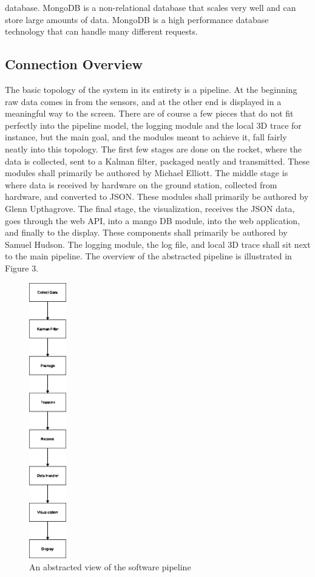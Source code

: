 \documentclass[onecolumn, draftclsnofoot,10pt, compsoc]{IEEEtran}
\begin{document}
database. MongoDB is a non-relational database that scales very well and can store large amounts of data. MongoDB is a high performance database technology that can handle many different requests.
\subsection {Connection Overview} 
The basic topology of the system in its entirety is a pipeline. At the beginning raw data comes in from the sensors, and at the other end is displayed in a meaningful way to the screen. There are of course a few pieces that do not fit perfectly into the pipeline model, the logging module and the local 3D trace for instance, but the main goal, and the modules meant to achieve it, fall fairly neatly into this topology. The first few stages are done on the rocket, where the data is collected, sent to a Kalman filter, packaged neatly and transmitted. These modules shall primarily be authored by Michael Elliott. The middle stage is where data is received by hardware on the ground station, collected from hardware, and converted to JSON. These modules shall primarily be authored by Glenn Upthagrove. The final stage, the visualization, receives the JSON data, goes through the web API, into a mango DB module, into the web application, and finally to the display. These components shall primarily be authored by Samuel Hudson. The logging module, the log file, and local 3D trace shall sit next to the main pipeline. The overview of the abstracted pipeline is illustrated in Figure 3. 
\begin{figure}[h]
    \centering
        \includegraphics[height=12cm]{basicpipeline}
        \caption{An abstracted view of the software pipeline}
        \label{fig:handel}
\end{figure}
\end{document}

